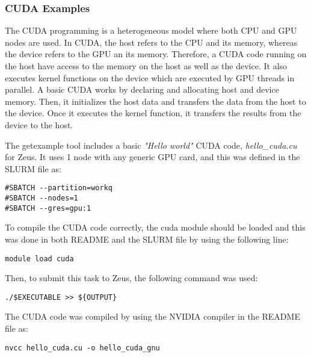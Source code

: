 \subsubsection{CUDA Examples}

The CUDA programming is a heterogeneous model where both CPU and GPU nodes are used. In CUDA, the host refers to the CPU and its memory, whereas the 
device refers to the GPU an its memory. Therefore, a CUDA code running on the host have access to the memory on the host as well as the device. It also 
executes kernel functions on the device which are executed by GPU threads in parallel. A basic CUDA works by declaring and allocating host and device 
memory. Then, it initializes the host data and transfers the data from the host to the device. Once it executes the kernel function, it transfers the 
results from the device to the host.

The getexample tool includes a basic \emph{"Hello world"} CUDA code, \emph{hello\_cuda.cu} for Zeus. It uses 1 node with any generic GPU card, and this 
was defined in the SLURM file as:

\begin{tcolorbox}
\begin{Verbatim}[fontsize=\scriptsize]
#SBATCH --partition=workq
#SBATCH --nodes=1
#SBATCH --gres=gpu:1
\end{Verbatim}
\end{tcolorbox}

To compile the CUDA code correctly, the cuda module should be loaded and this was done in both README and the SLURM file by using the following line:

\begin{tcolorbox}
\begin{Verbatim}[fontsize=\scriptsize]
module load cuda
\end{Verbatim}
\end{tcolorbox}

Then, to submit this task to Zeus, the following command was used:

\begin{tcolorbox}
\begin{Verbatim}[fontsize=\scriptsize]
./$EXECUTABLE >> ${OUTPUT}
\end{Verbatim}
\end{tcolorbox}

The CUDA code was compiled by using the NVIDIA compiler in the README file as:

\begin{tcolorbox}
\begin{Verbatim}[fontsize=\scriptsize]
nvcc hello_cuda.cu -o hello_cuda_gnu
\end{Verbatim}
\end{tcolorbox}
